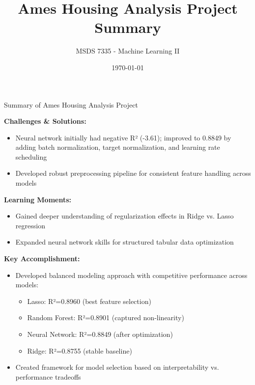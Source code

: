 \documentclass{beamer}
\title{Ames Housing Analysis Project Summary}
\author{MSDS 7335 - Machine Learning II}
\date{\today}
\begin{document}
\begin{frame}{Summary of Ames Housing Analysis Project}

\textbf{Challenges \& Solutions:}
\begin{itemize}
    \item Neural network initially had negative R² (-3.61); improved to 0.8849 by adding batch normalization, target normalization, and learning rate scheduling
    \item Developed robust preprocessing pipeline for consistent feature handling across models
\end{itemize}

\textbf{Learning Moments:}
\begin{itemize}
    \item Gained deeper understanding of regularization effects in Ridge vs. Lasso regression
    \item Expanded neural network skills for structured tabular data optimization
\end{itemize}

\textbf{Key Accomplishment:}
\begin{itemize}
    \item Developed balanced modeling approach with competitive performance across models:
    \begin{itemize}
        \item Lasso: R²=0.8960 (best feature selection)
        \item Random Forest: R²=0.8901 (captured non-linearity)
        \item Neural Network: R²=0.8849 (after optimization)
        \item Ridge: R²=0.8755 (stable baseline)
    \end{itemize}
    \item Created framework for model selection based on interpretability vs. performance tradeoffs
\end{itemize}

\end{frame}
\end{document}
